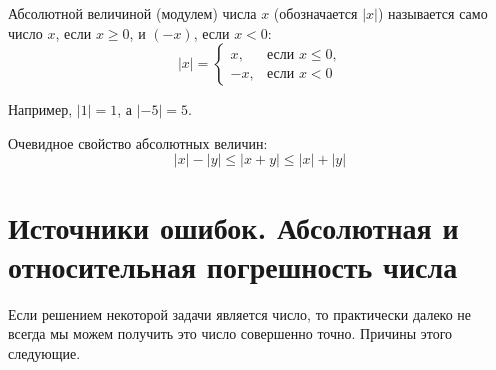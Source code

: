 \begin{definition}
	Абсолютной величиной (модулем) числа $x$ (обозначается $|x|$)
	называется само число $x$, если $x \geq 0$, и $(-x)$, если $x < 0$:
	$$|x| = \begin{cases}
		x, &\text{если $x \leq 0$,}\\
		-x, &\text{если $x < 0$}
	\end{cases}$$
\end{definition}
Например, $|1| = 1$, а $|-5| = 5$.

Очевидное свойство абсолютных величин:
$$|x| - |y| \leq |x + y| \leq |x| + |y|$$

\section[Погрешности числа]{Источники ошибок. Абсолютная и \linebreak
	относительная погрешность числа}
Если решением некоторой задачи является число, то практически далеко не всегда
мы можем получить это число совершенно точно. Причины этого следующие.

